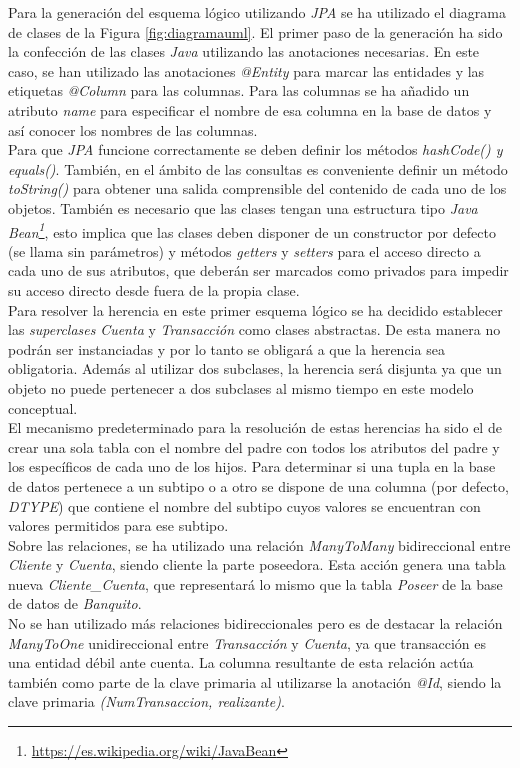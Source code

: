 \documentclass[11pt,a4paper]{article}
\begin{document}
Para la generación del esquema lógico utilizando \emph{JPA} se ha  utilizado el diagrama de clases de la Figura \ref{fig:diagramauml}. El primer paso de la generación ha sido la confección de las clases \emph{Java} utilizando las anotaciones necesarias. En este caso, se han utilizado las anotaciones \emph{@Entity} para marcar las entidades y las etiquetas \emph{@Column} para las columnas. Para las columnas se ha añadido un atributo \emph{name} para especificar el nombre de esa columna en la base de datos y así conocer los nombres de las columnas.\\
Para que \emph{JPA} funcione correctamente se deben definir los métodos \emph{hashCode() y equals()}. También, en el ámbito de las consultas es conveniente definir un método \emph{toString()} para obtener una salida comprensible del contenido de cada uno de los objetos. También es necesario que las clases tengan una estructura tipo \emph{Java Bean\footnote{\url{https://es.wikipedia.org/wiki/JavaBean}}}, esto implica que las clases deben disponer de un constructor por defecto (se llama sin parámetros) y métodos \emph{getters} y \emph{setters} para el acceso directo a cada uno de sus atributos, que deberán ser marcados como privados para impedir su acceso directo desde fuera de la propia clase.\\
Para resolver la herencia en este primer esquema lógico se ha decidido establecer las \emph{superclases} \emph{Cuenta} y \emph{Transacción} como clases abstractas. De esta manera no podrán ser instanciadas y por lo tanto se obligará a que la herencia sea obligatoria. Además al utilizar dos subclases, la herencia será disjunta ya que un objeto no puede pertenecer a dos subclases al mismo tiempo en este modelo conceptual.\\
El mecanismo predeterminado para la resolución de estas herencias ha sido el de crear una sola tabla con el nombre del padre con todos los atributos del padre y los específicos de cada uno de los hijos. Para determinar si una tupla en la base de datos pertenece a un subtipo o a otro se dispone de una columna (por defecto, \emph{DTYPE}) que contiene el nombre del subtipo cuyos valores se encuentran con valores permitidos para ese subtipo.\\
Sobre las relaciones, se ha utilizado una relación \emph{ManyToMany} bidireccional entre \emph{Cliente} y \emph{Cuenta}, siendo cliente la parte poseedora. Esta acción genera una tabla nueva \emph{Cliente\_{}Cuenta}, que representará lo mismo que la tabla \emph{Poseer} de la base de datos de \emph{Banquito}.\\
No se han utilizado más relaciones bidireccionales pero es de destacar la relación \emph{ManyToOne} unidireccional entre \emph{Transacción} y \emph{Cuenta}, ya que transacción es una entidad débil ante cuenta. La columna resultante de esta relación actúa también como parte de la clave primaria al utilizarse la anotación \emph{@Id}, siendo la clave primaria \emph{(NumTransaccion, realizante)}.
\end{document}
